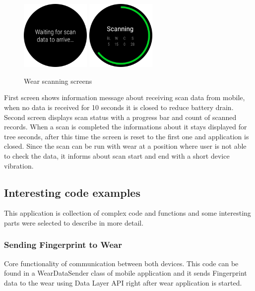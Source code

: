 \begin{figure}[H]
	\begin{centering}
		\includegraphics[width=0.3\textwidth]{img/wear_waiting_edited}
		\hspace{0.5cm}
		\includegraphics[width=0.3\textwidth]{img/wear_scanning_edited}
		\par\end{centering}
	\caption{Wear scanning screens}
	\label{fig09c05}
\end{figure}

First screen shows information message about receiving scan data from mobile, when no data is received for 10 seconds it is closed to reduce battery drain. Second screen displays scan status with a progress bar and count of scanned records. When a scan is completed the informations about it stays displayed for tree seconds, after this time the screen is reset to the first one and application is closed. Since the scan can be run with wear at a position where user is not able to check the data, it informs about scan start and end with a short device vibration.

\subsection{Interesting code examples}\label{subsec:Interesting code examples}
This application is collection of complex code and functions and some interesting parts were selected to describe in more detail.

\subsubsection{Sending Fingerprint to Wear}\label{subsubsec:SendingFingerprintToWear}
Core functionality of communication between both devices. This code can be found in a WearDataSender class of mobile application and it sends Fingerprint data to the wear using Data Layer API right after wear application is started.

